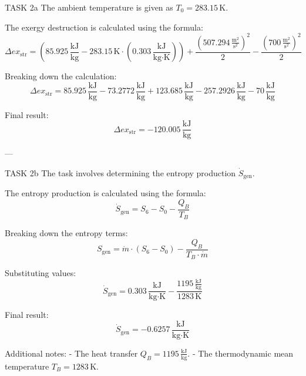 TASK 2a  
The ambient temperature is given as \( T_0 = 283.15 \, \text{K} \).  

The exergy destruction is calculated using the formula:  
\[
\Delta ex_{\text{str}} = \left( 85.925 \, \frac{\text{kJ}}{\text{kg}} - 283.15 \, \text{K} \cdot \left( 0.303 \, \frac{\text{kJ}}{\text{kg·K}} \right) \right) + \frac{\left( 507.294 \, \frac{\text{m}^2}{\text{s}^2} \right)^2}{2} - \frac{\left( 700 \, \frac{\text{m}^2}{\text{s}^2} \right)^2}{2}
\]

Breaking down the calculation:  
\[
\Delta ex_{\text{str}} = 85.925 \, \frac{\text{kJ}}{\text{kg}} - 73.2772 \, \frac{\text{kJ}}{\text{kg}} + 123.685 \, \frac{\text{kJ}}{\text{kg}} - 257.2926 \, \frac{\text{kJ}}{\text{kg}} - 70 \, \frac{\text{kJ}}{\text{kg}}
\]

Final result:  
\[
\Delta ex_{\text{str}} = -120.005 \, \frac{\text{kJ}}{\text{kg}}
\]

---

TASK 2b  
The task involves determining the entropy production \( \dot{S}_{\text{gen}} \).  

The entropy production is calculated using the formula:  
\[
\dot{S}_{\text{gen}} = S_6 - S_0 - \frac{Q_B}{T_B}
\]

Breaking down the entropy terms:  
\[
S_{\text{gen}} = \dot{m} \cdot \left( S_6 - S_0 \right) - \frac{Q_B}{T_B \cdot \dot{m}}
\]

Substituting values:  
\[
\dot{S}_{\text{gen}} = 0.303 \, \frac{\text{kJ}}{\text{kg·K}} - \frac{1195 \, \frac{\text{kJ}}{\text{kg}}}{1283 \, \text{K}}
\]

Final result:  
\[
\dot{S}_{\text{gen}} = -0.6257 \, \frac{\text{kJ}}{\text{kg·K}}
\]  

Additional notes:  
- The heat transfer \( Q_B = 1195 \, \frac{\text{kJ}}{\text{kg}} \).  
- The thermodynamic mean temperature \( T_B = 1283 \, \text{K} \).